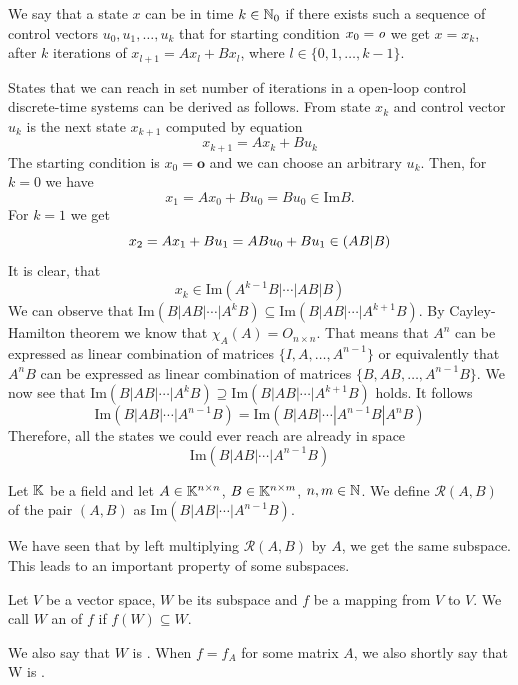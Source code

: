 \begin{definition}
	We say that a state $x$ can be  in time $k\in\mathbb{N}_0$ if there exists such a sequence of control vectors $u_0,u_1,\ldots,u_k$ that for starting condition $x_0=\textit{o}$ we get $x=x_k$, after $k$ iterations of $x_{l+1}=Ax_l+Bx_l$, where $l\in\{0,1,\ldots,k-1\}$.
\end{definition}

States that we can reach in set number of iterations in a open-loop control discrete-time systems can be derived as follows. From state $x_k$ and control vector $u_k$ is the next state $x_{k+1}$ computed by equation
$$x_{k+1}=Ax_k+Bu_k$$
The starting condition is $x_0=\textbf{o}$ and we can choose an arbitrary $u_k$. Then, for $k=0$ we have $$x_1=Ax_0+Bu_0=Bu_0 \in \text{Im}B.$$ For $k=1$ we get
$$x_2=Ax_1+Bu_1=ABu_0+Bu_1\in\text(AB|B)$$
It is clear, that
$$x_k\in\text{Im}(A^{k-1}B|\cdots|AB|B)$$
We can observe that $\text{Im}(B|AB|\cdots|A^kB) \subseteq \text{Im}(B|AB|\cdots|A^{k+1}B)$. By Cayley-Hamilton theorem we know that $\chi_A(A)=O_{n\times n}$. That means that $A^n$ can be expressed as linear combination of matrices $\{I,A,\ldots,A^{n-1}\}$ or equivalently that $A^nB$ can be expressed as linear combination of matrices $\{B,AB,\ldots,A^{n-1}B\}$. We now see that $\text{Im}(B|AB|\cdots|A^kB) \supseteq \text{Im}(B|AB|\cdots|A^{k+1}B)$ holds. It follows
\begin{equation}
\label{eq:cayleHamilReachable}
	\text{Im}(B|AB|\cdots|A^{n-1}B)=\text{Im}(B|AB|\cdots|A^{n-1}B|A^nB)
\end{equation}
Therefore, all the states we could ever reach are already in space
$$\text{Im}(B|AB|\cdots|A^{n-1}B)$$

\begin{definition}
	Let $\mathbb{K}$ be a field and let $A \in \mathbb{K}^{n \times n}$, $B \in \mathbb{K}^{n \times m}$, $n,m \in \mathbb{N}$. We define  $\mathcal{R}(A,B)$ of the pair $(A,B)$ as $\text{Im}(B|AB|\cdots|A^{n-1}B)$.
\end{definition}

We have seen that by left multiplying $\mathcal{R}(A,B)$ by $A$, we get the same subspace. This leads to an important property of some subspaces.

\begin{definition}
	Let $V$ be a vector space, $W$ be its subspace and $f$ be a mapping from $V$ to $V$. We call $W$ an  of $f$ if $f(W)\subseteq W$.

	We also say that $W$ is . When $f=f_A$ for some matrix $A$, we also shortly say that W is .
\end{definition}

